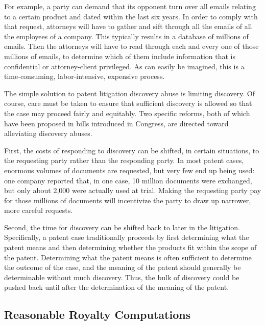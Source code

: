 \documentclass[11pt,twocolumn,titlepage]{article}
\begin{document}
For example, a party can demand that its opponent turn over all emails relating
to a certain product and dated within the last six years. In order to comply
with that request, attorneys will have to gather and sift through all the emails
of all the employees of a company. This typically results in a database of
millions of emails. Then the attorneys will have to read through each and every
one of those millions of emails, to determine which of them include information
that is confidential or attorney-client privileged. As can easily be imagined,
this is a time-consuming, labor-intensive, expensive process.

The simple solution to patent litigation discovery abuse is limiting discovery.
Of course, care must be taken to ensure that sufficient discovery is allowed so
that the case may proceed fairly and equitably. Two specific reforms, both of
which have been proposed in bills introduced in Congress,
are directed toward alleviating discovery abuses.

First, the costs
of responding to discovery can be shifted, in certain situations, to the
requesting party rather than the responding party. In most patent cases,
enormous volumes of documents are requested, but very few end up being used: one
company reported that, in one case, 10 million documents were exchanged, but
only about 2,000 were actually used at trial. Making the requesting party pay for those millions of
documents will incentivize the party to draw up narrower, more careful requests.

Second, the time
for discovery can be shifted back to later in the litigation. Specifically, a
patent case traditionally proceeds by first determining what the patent means
and then determining whether the products fit within the scope of the patent.
Determining what the patent means is often sufficient to determine the outcome
of the case, and the meaning of the patent should generally be determinable
without much discovery. Thus, the bulk of discovery could be pushed back until
after the determination of the meaning of the patent.

\subsection{Reasonable Royalty Computations}
\SectionNote
{}
\end{document}
